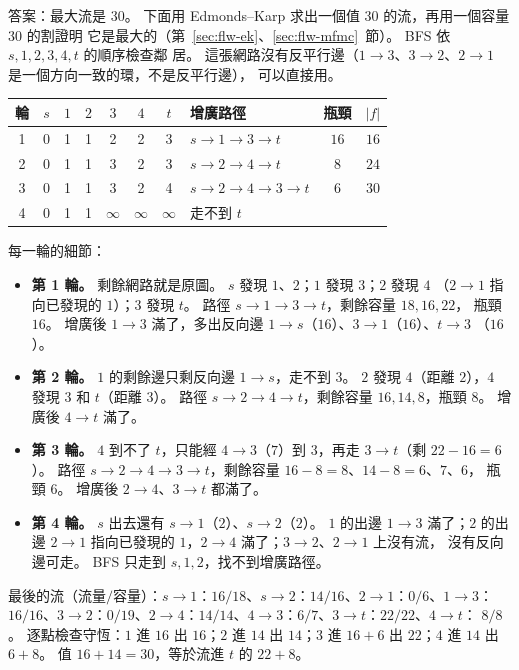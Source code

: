 答案：最大流是 $30$。 下面用 Edmonds--Karp 求出一個值 $30$ 的流，再用一個容量 $30$ 的割證明
它是最大的（第~\ref{sec:flw-ek}、\ref{sec:flw-mfmc}~節）。 BFS 依 $s, 1, 2, 3, 4, t$ 的順序檢查鄰
居。 這張網路沒有反平行邊（$1 \to 3$、$3 \to 2$、$2 \to 1$ 是一個方向一致的環，不是反平行邊），
可以直接用。

\begin{center}
\small
\begin{tabular}{c|cccccc|lcc}
\toprule
輪 & $s$ & $1$ & $2$ & $3$ & $4$ & $t$ & 增廣路徑 & 瓶頸 & $|f|$ \\
\midrule
1 & 0 & 1 & 1 & 2 & 2 & 3 & $s \to 1 \to 3 \to t$ & $16$ & $16$ \\
2 & 0 & 1 & 1 & 3 & 2 & 3 & $s \to 2 \to 4 \to t$ & $8$ & $24$ \\
3 & 0 & 1 & 1 & 3 & 2 & 4 & $s \to 2 \to 4 \to 3 \to t$ & $6$ & $30$ \\
4 & 0 & 1 & 1 & $\infty$ & $\infty$ & $\infty$ & 走不到 $t$ & & \\
\bottomrule
\end{tabular}
\end{center}

每一輪的細節：
\begin{itemize}
\item \textbf{第 1 輪。} 剩餘網路就是原圖。 $s$ 發現 $1$、$2$；$1$ 發現 $3$；$2$ 發現 $4$
（$2 \to 1$ 指向已發現的 $1$）；$3$ 發現 $t$。 路徑 $s \to 1 \to 3 \to t$，剩餘容量 $18, 16, 22$，
瓶頸 $16$。 增廣後 $1 \to 3$ 滿了，多出反向邊 $1 \to s$（$16$）、$3 \to 1$（$16$）、$t \to 3$
（$16$）。
\item \textbf{第 2 輪。} $1$ 的剩餘邊只剩反向邊 $1 \to s$，走不到 $3$。 $2$ 發現 $4$（距離
$2$），$4$ 發現 $3$ 和 $t$（距離 $3$）。 路徑 $s \to 2 \to 4 \to t$，剩餘容量 $16, 14, 8$，瓶頸
$8$。 增廣後 $4 \to t$ 滿了。
\item \textbf{第 3 輪。} $4$ 到不了 $t$，只能經 $4 \to 3$（$7$）到 $3$，再走 $3 \to t$（剩
$22 - 16 = 6$）。 路徑 $s \to 2 \to 4 \to 3 \to t$，剩餘容量 $16 - 8 = 8$、$14 - 8 = 6$、$7$、$6$，
瓶頸 $6$。 增廣後 $2 \to 4$、$3 \to t$ 都滿了。
\item \textbf{第 4 輪。} $s$ 出去還有 $s \to 1$（$2$）、$s \to 2$（$2$）。 $1$ 的出邊 $1 \to 3$
滿了；$2$ 的出邊 $2 \to 1$ 指向已發現的 $1$，$2 \to 4$ 滿了；$3 \to 2$、$2 \to 1$ 上沒有流，
沒有反向邊可走。 BFS 只走到 $s, 1, 2$，找不到增廣路徑。
\end{itemize}

最後的流（流量$/$容量）：$s \to 1$：$16/18$、$s \to 2$：$14/16$、$2 \to 1$：$0/6$、$1 \to 3$：
$16/16$、$3 \to 2$：$0/19$、$2 \to 4$：$14/14$、$4 \to 3$：$6/7$、$3 \to t$：$22/22$、$4 \to t$：
$8/8$。 逐點檢查守恆：$1$ 進 $16$ 出 $16$；$2$ 進 $14$ 出 $14$；$3$ 進 $16 + 6$ 出 $22$；$4$ 進
$14$ 出 $6 + 8$。 值 $16 + 14 = 30$，等於流進 $t$ 的 $22 + 8$。

